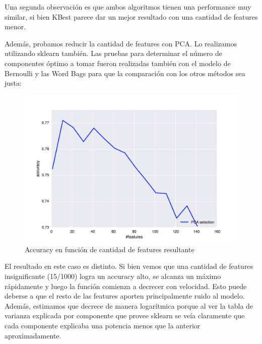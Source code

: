 Una segunda observación es que ambos algoritmos tienen una performance muy similar, si bien KBest parece dar un mejor resultado con una cantidad
de features menor.

Además, probamos reducir la cantidad de features con PCA. Lo realizamos utilizando sklearn también. Las pruebas para determinar el número
de componentes óptimo a tomar fueron realizadas también con el modelo de Bernoulli y las Word Bags para que la comparación con los otros métodos
sea justa:

\begin{figure}
	\includegraphics[scale=0.2]{figures/bernoulli_pca.jpg}
	\caption{Accuracy en función de cantidad de features resultante}
\end{figure}

El resultado en este caso es distinto. Si bien vemos que una cantidad de features insignificante (15/1000) logra un accuracy alto, se alcanza
un máximo rápidamente y luego la función comienza a decrecer con velocidad. Esto puede deberse a que el resto de las features aporten principalmente
ruido al modelo. Además, estimamos que decrece de manera logarítmica porque al ver la tabla de varianza explicada por componente que provee sklearn
se veía claramente que cada componente explicaba una potencia menos que la anterior aproximadamente.
